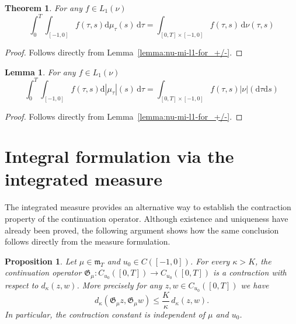 \documentclass[reqno]{amsart}
\theoremstyle{plain}
\newtheorem{theorem}{Theorem}[section]
\newtheorem{lemma}{Lemma}[section]
\newtheorem{proposition}{Proposition}[section]
\numberwithin{equation}{section}
\numberwithin{definition}{section}
\newcommand{\dd}{\ensuremath{\mathrm{d}}}
\begin{document}
\begin{theorem}\label{thm:integrated-eq}
    For any $f\in L_1(\nu)$ 
 \begin{equation*}
  \int_0^T \int_{[-1,0]} f(\tau,s) \dd \mu_{\tau} (s) \,\dd\tau = \int_{[0,T]\times [-1,0]} f(\tau,s) \, \dd \nu(\tau,s) 
\end{equation*} 
\end{theorem}
\begin{proof}
    Follows directly from Lemma~\ref{lemma:nu-mi-l1-for_+/-}. 
\end{proof}
\begin{lemma} \label{lemma:nu-modulus}
For any $f\in L_1(\nu)$  
\begin{equation*}
  \int_0^T \int_{[-1,0]} f(\tau,s) \dd |\mu_{\tau}| (s) \,\dd\tau = \int_{[0,T]\times [-1,0]} f(\tau,s) |\nu|(\dd \tau\dd s )  
\end{equation*}  
\end{lemma}
\begin{proof}
     Follows directly from Lemma~\ref{lemma:nu-mi-l1-for_+/-}. 
\end{proof}


\section{Integral formulation via the integrated measure}\label{sec:Integral-formulation}

The integrated measure provides an alternative way to establish
the contraction property of the continuation operator.
Although existence and uniqueness have already been proved,
the following argument shows how the same conclusion follows
directly from the measure formulation.

\begin{proposition}
\label{prop:integrated-contraction}
Let $\mu\in\mathfrak{m}_T$ and $u_0\in C([-1,0])$.
For every $\kappa>K$, the continuation operator $\mathfrak{G}_\mu:
C_{u_0}([0,T])\to C_{u_0}([0,T])$
is a contraction with respect to $d_\kappa(z,w)$. 
More precisely for any $z,w\in C_{u_0}([0,T])$ we have 
\begin{equation*}
d_\kappa(\mathfrak{G}_\mu z,\mathfrak{G}_\mu w)
\le
\frac{K}{\kappa}\,d_\kappa(z,w). 
\end{equation*}
In particular, the contraction constant is independent of
$\mu$ and $u_0$.
\end{proposition}
\end{document}
